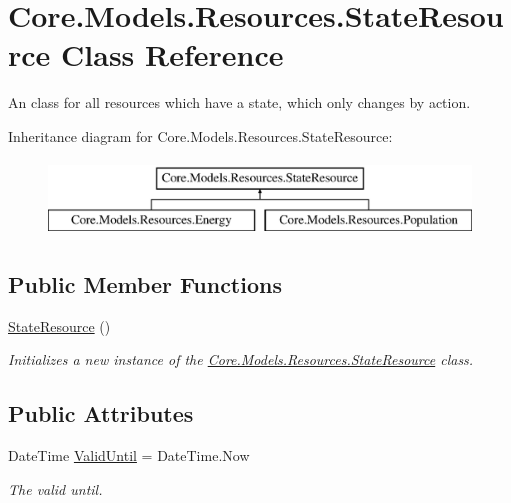 \hypertarget{classCore_1_1Models_1_1Resources_1_1StateResource}{}\section{Core.\+Models.\+Resources.\+State\+Resource Class Reference}
\label{classCore_1_1Models_1_1Resources_1_1StateResource}


An class for all resources which have a state, which only changes by action.  


Inheritance diagram for Core.\+Models.\+Resources.\+State\+Resource\+:\begin{figure}[H]
\begin{center}
\leavevmode
\includegraphics[height=2.000000cm]{classCore_1_1Models_1_1Resources_1_1StateResource}
\end{center}
\end{figure}
\subsection*{Public Member Functions}
\begin{DoxyCompactItemize}
\item 
\hyperlink{classCore_1_1Models_1_1Resources_1_1StateResource_ae20f4a4001d1fdf687ec5d3e80d88e47}{State\+Resource} ()
\begin{DoxyCompactList}\small\item\em Initializes a new instance of the \hyperlink{classCore_1_1Models_1_1Resources_1_1StateResource}{Core.\+Models.\+Resources.\+State\+Resource} class. \end{DoxyCompactList}\end{DoxyCompactItemize}
\subsection*{Public Attributes}
\begin{DoxyCompactItemize}
\item 
Date\+Time \hyperlink{classCore_1_1Models_1_1Resources_1_1StateResource_a3d193aeed5497bc53eebff825f32f3b9}{Valid\+Until} = Date\+Time.\+Now
\begin{DoxyCompactList}\small\item\em The valid until. \end{DoxyCompactList}\end{DoxyCompactItemize}
